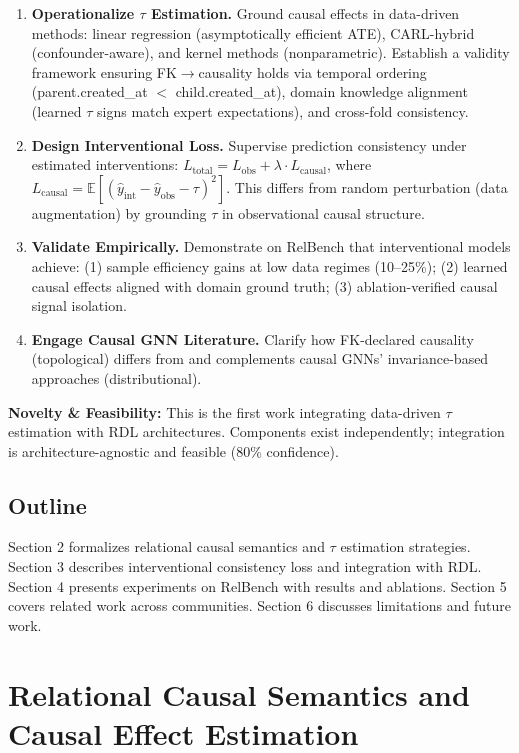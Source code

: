 \documentclass[11pt,letterpaper]{article}
\begin{document}
\begin{enumerate}
\item \textbf{Operationalize $\tau$ Estimation.} Ground causal effects in data-driven methods: linear regression (asymptotically efficient ATE), CARL-hybrid (confounder-aware), and kernel methods (nonparametric). Establish a validity framework ensuring FK$\rightarrow$causality holds via temporal ordering (parent.created\_at $<$ child.created\_at), domain knowledge alignment (learned $\tau$ signs match expert expectations), and cross-fold consistency.

\item \textbf{Design Interventional Loss.} Supervise prediction consistency under estimated interventions: $L_{\text{total}} = L_{\text{obs}} + \lambda \cdot L_{\text{causal}}$, where $L_{\text{causal}} = \mathbb{E}[(\hat{y}_{\text{int}} - \hat{y}_{\text{obs}} - \tau)^2]$. This differs from random perturbation (data augmentation) by grounding $\tau$ in observational causal structure.

\item \textbf{Validate Empirically.} Demonstrate on RelBench that interventional models achieve: (1) sample efficiency gains at low data regimes (10--25\%); (2) learned causal effects aligned with domain ground truth; (3) ablation-verified causal signal isolation.

\item \textbf{Engage Causal GNN Literature.} Clarify how FK-declared causality (topological) differs from and complements causal GNNs' invariance-based approaches (distributional).
\end{enumerate}

\textbf{Novelty \& Feasibility:} This is the first work integrating data-driven $\tau$ estimation with RDL architectures. Components exist independently; integration is architecture-agnostic and feasible (80\% confidence).

\subsection{Outline}

Section 2 formalizes relational causal semantics and $\tau$ estimation strategies. Section 3 describes interventional consistency loss and integration with RDL. Section 4 presents experiments on RelBench with results and ablations. Section 5 covers related work across communities. Section 6 discusses limitations and future work.

\section{Relational Causal Semantics and Causal Effect Estimation}
\end{document}
